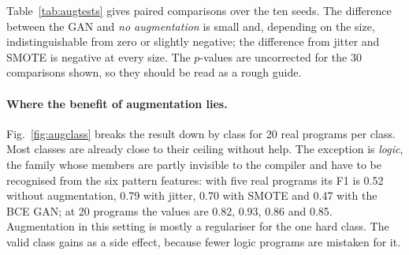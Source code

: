\documentclass[conference]{IEEEtran}
\begin{document}
Table~\ref{tab:augtests} gives paired comparisons over the ten seeds. The difference between the GAN and \emph{no augmentation}
is small and, depending on the size, indistinguishable from zero or slightly negative; the difference from jitter and SMOTE is
negative at every size. The $p$-values are uncorrected for the 30 comparisons shown, so they should be read as a rough guide.

\begin{table}[t]
\centering
\caption{Paired difference in macro-F1 (random forest) between each GAN and three alternatives, with the two-sided
paired $t$-test $p$-value in parentheses. Negative values mean the GAN is worse.}
\label{tab:augtests}
\footnotesize
{}
\end{table}

\paragraph{Where the benefit of augmentation lies.} Fig.~\ref{fig:augclass} breaks the result down by class for 20 real
programs per class. Most classes are already close to their ceiling without help. The exception is \emph{logic}, the family whose
members are partly invisible to the compiler and have to be recognised from the six pattern features: with five real programs
its F1 is 0.52 without augmentation, 0.79 with jitter, 0.70 with SMOTE and 0.47 with the BCE GAN; at 20 programs the values are
0.82, 0.93, 0.86 and 0.85. Augmentation in this setting is mostly a regulariser for the one hard class. The valid class
gains as a side effect, because fewer logic programs are mistaken for it.
\end{document}
